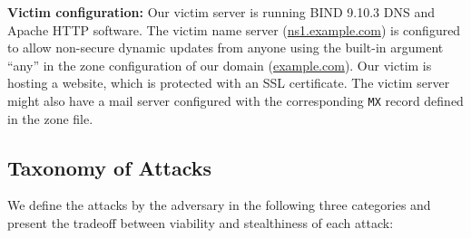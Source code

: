 
\textbf{Victim configuration:} Our victim server is running BIND 9.10.3 DNS and Apache HTTP software. 
The victim name server (\url{ns1.example.com}) is configured to allow non-secure dynamic updates %
from anyone using the built-in argument ``any'' in the zone configuration of our domain (\url{example.com}). %
%
Our victim is hosting a website, 
which is protected with an SSL certificate. 
The victim server might also have a mail server configured with the corresponding \texttt{MX} record defined in the zone file.  


\subsection{Taxonomy of Attacks}
We define the attacks by the adversary in the following three categories and present the tradeoff between viability and stealthiness of each attack:


